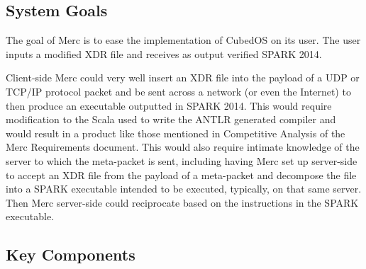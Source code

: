 \subsection{System Goals}

The goal of Merc is to ease the implementation of CubedOS on its user. The user inputs a
modified XDR file and receives as output verified SPARK 2014.

Client-side Merc could very well insert an XDR file into the payload of a UDP or TCP/IP
protocol packet and be sent across a network (or even the Internet) to then produce an
executable outputted in SPARK 2014. This would require modification to the Scala used to write
the ANTLR generated compiler and would result in a product like those mentioned in Competitive
Analysis of the Merc Requirements document. This would also require intimate knowledge of the
server to which the meta-packet is sent, including having Merc set up server-side to accept
an XDR file from the payload of a meta-packet and decompose the file into a SPARK executable
intended to be executed, typically, on that same server. Then Merc server-side could
reciprocate based on the instructions in the SPARK executable.

\subsection{Key Components}

